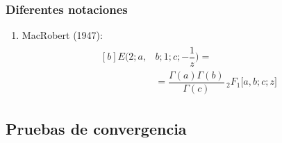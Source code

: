 \documentclass[12pt]{beamer}
\begin{document}
\begin{frame}
\frametitle{Diferentes notaciones}
\begin{enumerate}[<+->]    
\conti
\item MacRobert (1947):
\begin{align}
\begin{aligned}[b]
E \big( 2; a, &b; 1; c; -\dfrac{1}{z} \big) = \\[0.5em]
&= \dfrac{\Gamma (a) \Gamma (b)}{\Gamma (c)} \, {}_{2} F_{1} \big[ a, b; c; z \big]
\label{eq:ecuacion_01_01_01_09}
\end{aligned}
\end{align}
\end{enumerate}
\end{frame}

\subsection{Pruebas de convergencia}
\end{document}

